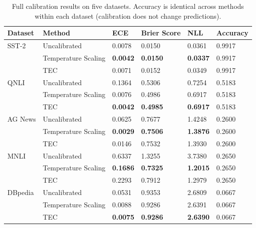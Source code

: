 \documentclass[11pt,letterpaper]{article}
\begin{document}
\begin{table}[!htbp]
  \centering
  \begin{tabular}{llllll}
    \toprule
    Dataset & Method & ECE & Brier Score & NLL & Accuracy \\
    \midrule
    SST-2 & Uncalibrated & 0.0078 & 0.0150 & 0.0361 & 0.9917 \\
           & Temperature Scaling & \textbf{0.0042} & \textbf{0.0150} & \textbf{0.0337} & 0.9917 \\
           & TEC & 0.0071 & 0.0152 & 0.0349 & 0.9917 \\
    \midrule
    QNLI & Uncalibrated & 0.1364 & 0.5306 & 0.7254 & 0.5183 \\
          & Temperature Scaling & 0.0076 & 0.4986 & 0.6917 & 0.5183 \\
          & TEC & \textbf{0.0042} & \textbf{0.4985} & \textbf{0.6917} & 0.5183 \\
    \midrule
    AG News & Uncalibrated & 0.0625 & 0.7677 & 1.4248 & 0.2600 \\
             & Temperature Scaling & \textbf{0.0029} & \textbf{0.7506} & \textbf{1.3876} & 0.2600 \\
             & TEC & 0.0146 & 0.7532 & 1.3930 & 0.2600 \\
    \midrule
    MNLI & Uncalibrated & 0.6337 & 1.3255 & 3.7380 & 0.2650 \\
          & Temperature Scaling & \textbf{0.1686} & \textbf{0.7325} & \textbf{1.2015} & 0.2650 \\
          & TEC & 0.2293 & 0.7912 & 1.2979 & 0.2650 \\
    \midrule
    DBpedia & Uncalibrated & 0.0531 & 0.9353 & 2.6809 & 0.0667 \\
             & Temperature Scaling & 0.0088 & 0.9286 & 2.6391 & 0.0667 \\
             & TEC & \textbf{0.0075} & \textbf{0.9286} & \textbf{2.6390} & 0.0667 \\
    \bottomrule
  \end{tabular}
  \caption{Full calibration results on five datasets. Accuracy is identical across methods within each dataset (calibration does not change predictions).}
  \label{tab:full_results}
\end{table}
\end{document}
